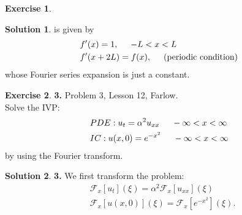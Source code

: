 \documentclass{article}
\theoremstyle{definition}
\newtheorem*{exer*}{Exercise}
\newtheorem*{sln*}{Solution}
\newcommand{\F}{\mathcal{F}}
\newcommand{\lb}{\left[}
\newcommand{\rb}{\right]}
\begin{document}
\begin{exer*}
\begin{sln*}
	is given by
	\begin{align*}
	&f'(x) = 1, \hspace{0.5cm}-L < x < L\\
	&f'(x+2L) = f(x), \hspace{0.5cm} \text{(periodic condition)}
	\end{align*}
	whose Fourier series expansion is just a constant. 
	\end{sln*}
\end{exer*}

\newpage

\begin{exer*}\textbf{3. }Problem 3, Lesson 12, Farlow.\\
	
	Solve the IVP:
	\begin{align*}
	&PDE: u_t = \alpha^2 u_{xx}\hspace{0.5cm} -\infty < x < \infty \\
	&IC: u(x,0) = e^{-x^2} \hspace{0.5cm} -\infty < x < \infty
	\end{align*}
	by using the Fourier transform.
	
	\begin{sln*}\textbf{3. }
		We first transform the problem:
		\begin{align*}
		&\F_x[u_t](\xi) = \alpha^2 \F_x[u_{xx}](\xi)\\
		&\F_x[u(x,0)](\xi) = \F_x\lb e^{-x^2} \rb(\xi).
		\end{align*}
		

\end{sln*}
\end{exer*}
\end{document}
